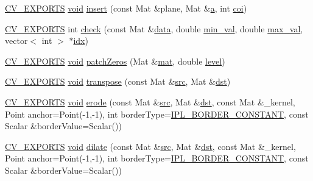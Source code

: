 \begin{DoxyCompactItemize}
\item 
\hyperlink{core_2types__c_8h_a1bf9f0e121b54272da02379cfccd0a2b}{C\-V\-\_\-\-E\-X\-P\-O\-R\-T\-S} \hyperlink{legacy_8hpp_a8bb47f092d473522721002c86c13b94e}{void} \hyperlink{namespacecvtest_a9c6ea7d8b339c0ec8385154ad331ee0f}{insert} (const Mat \&plane, Mat \&\hyperlink{legacy_8hpp_a1031d0e0a97a340abfe0a6ab9e831045}{a}, int \hyperlink{core__c_8h_a77674fb914cf2e14c0ddff790b225dbe}{coi})
\item 
\hyperlink{core_2types__c_8h_a1bf9f0e121b54272da02379cfccd0a2b}{C\-V\-\_\-\-E\-X\-P\-O\-R\-T\-S} int \hyperlink{namespacecvtest_a8543a691c795c3f9bbfbb19cdb377790}{check} (const Mat \&\hyperlink{legacy_8hpp_ab9fe6c09e6d02865a953fffc12fe6ca0}{data}, double \hyperlink{core__c_8h_a2c60d4e453921f07a407a647c96e8316}{min\-\_\-val}, double \hyperlink{core__c_8h_a928495205a5ca34548c11042d48d733b}{max\-\_\-val}, vector$<$ int $>$ $\ast$\hyperlink{core__c_8h_a5c7c842f447336aa2f10826df65a28b3}{idx})
\item 
\hyperlink{core_2types__c_8h_a1bf9f0e121b54272da02379cfccd0a2b}{C\-V\-\_\-\-E\-X\-P\-O\-R\-T\-S} \hyperlink{legacy_8hpp_a8bb47f092d473522721002c86c13b94e}{void} \hyperlink{namespacecvtest_a875892bf4b05664246e17498fe6f9065}{patch\-Zeros} (Mat \&\hyperlink{imgproc__c_8h_ad9325e85114e7b9ab738a23b62ea10a0}{mat}, double \hyperlink{tracking_8hpp_ac693e272fb1883fe0343f55a14d72b22}{level})
\item 
\hyperlink{core_2types__c_8h_a1bf9f0e121b54272da02379cfccd0a2b}{C\-V\-\_\-\-E\-X\-P\-O\-R\-T\-S} \hyperlink{legacy_8hpp_a8bb47f092d473522721002c86c13b94e}{void} \hyperlink{namespacecvtest_a5afd7dc69b9f9e91a7ff2615d29dcd52}{transpose} (const Mat \&\hyperlink{legacy_8hpp_a371cd109b74033bc4366f584edd3dacc}{src}, Mat \&\hyperlink{photo__c_8h_aed13e2a25279b24dc954073233fef7a5}{dst})
\item 
\hyperlink{core_2types__c_8h_a1bf9f0e121b54272da02379cfccd0a2b}{C\-V\-\_\-\-E\-X\-P\-O\-R\-T\-S} \hyperlink{legacy_8hpp_a8bb47f092d473522721002c86c13b94e}{void} \hyperlink{namespacecvtest_aeb152e6a82e24d8019ff81fe96af3314}{erode} (const Mat \&\hyperlink{legacy_8hpp_a371cd109b74033bc4366f584edd3dacc}{src}, Mat \&\hyperlink{photo__c_8h_aed13e2a25279b24dc954073233fef7a5}{dst}, const Mat \&\-\_\-kernel, Point anchor=Point(-\/1,-\/1), int border\-Type=\hyperlink{core_2types__c_8h_a3775e9c53907519fd716c628c3af8c3b}{I\-P\-L\-\_\-\-B\-O\-R\-D\-E\-R\-\_\-\-C\-O\-N\-S\-T\-A\-N\-T}, const Scalar \&border\-Value=Scalar())
\item 
\hyperlink{core_2types__c_8h_a1bf9f0e121b54272da02379cfccd0a2b}{C\-V\-\_\-\-E\-X\-P\-O\-R\-T\-S} \hyperlink{legacy_8hpp_a8bb47f092d473522721002c86c13b94e}{void} \hyperlink{namespacecvtest_abcb992a5f861df28d90c71272a3689f9}{dilate} (const Mat \&\hyperlink{legacy_8hpp_a371cd109b74033bc4366f584edd3dacc}{src}, Mat \&\hyperlink{photo__c_8h_aed13e2a25279b24dc954073233fef7a5}{dst}, const Mat \&\-\_\-kernel, Point anchor=Point(-\/1,-\/1), int border\-Type=\hyperlink{core_2types__c_8h_a3775e9c53907519fd716c628c3af8c3b}{I\-P\-L\-\_\-\-B\-O\-R\-D\-E\-R\-\_\-\-C\-O\-N\-S\-T\-A\-N\-T}, const Scalar \&border\-Value=Scalar())

\end{DoxyCompactItemize}

